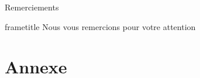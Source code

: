 \documentclass{beamer}
\begin{document}
\section*{}

\begin{frame}{Remerciements}
  \begin{beamercolorbox}[ht=2.5ex,dp=1.5ex,center]{frametitle}
    Nous vous remercions pour votre attention
  \end{beamercolorbox}
\end{frame}

\appendix

\section*{Annexe}

%
%
%
%
%
\end{document}
